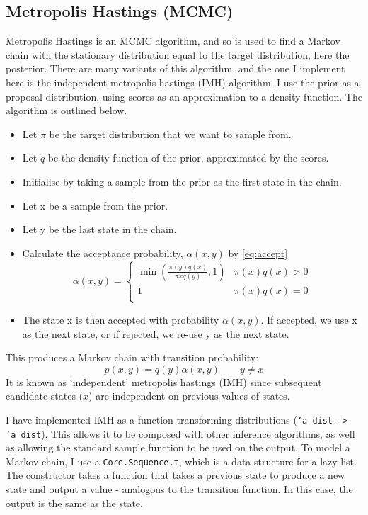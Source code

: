 \subsection{Metropolis Hastings (MCMC)} \label{sec:mh}
Metropolis Hastings is an MCMC algorithm, and so is used to find a Markov chain with the stationary distribution equal to the target distribution, here the posterior. There are many variants of this algorithm, and the one I implement here is the independent metropolis hastings (IMH) algorithm. I use the prior as a proposal distribution, using scores as an approximation to a density function. The algorithm is outlined below.
\begin{itemize}[itemsep=-0.8ex]
	\item Let $\pi$ be the target distribution that we want to sample from.
	\item Let $q$ be the density function of the prior, approximated by the scores.
	\item Initialise by taking a sample from the prior as the first state in the chain.
	\item Let x be a sample from the prior.
	\item Let y be the last state in the chain.
	\item Calculate the acceptance probability, $\alpha(x,y)$ by \eqref{eq:accept}
	      \begin{equation}
	      	\label{eq:accept}
	      	\alpha(x,y) = 
	      	\begin{cases}
	      		\min{\left( \frac{\pi(y)q(x)}{\pi{x}q(y)},1 \right) } & \pi(x)q(x) > 0 \\
	      		1                                                     & \pi(x)q(x) = 0 \\
	      	\end{cases}
	      \end{equation}	      	      	      	      
	\item The state x is then accepted with probability $\alpha(x,y)$. If accepted, we use x as the next state, or if rejected, we re-use y as the next state. 
\end{itemize}
	
This produces a Markov chain with transition probability: \[p(x, y) = q(y)\alpha(x, y) \quad\quad y\neq x\]
It is known as `independent' metropolis hastings (IMH) since subsequent candidate states ($x$) are independent on previous values of states.
	
I have implemented IMH as a function transforming distributions (\texttt{'a dist -> 'a dist}). This allows it to be composed with other inference algorithms, as well as allowing the standard sample function to be used on the output. To model a Markov chain, I use a \texttt{Core.Sequence.t}, which is a data structure for a lazy list. The constructor takes a function that takes a previous state to produce a new state and output a value - analogous to the transition function. In this case, the output is the same as the state.
	
